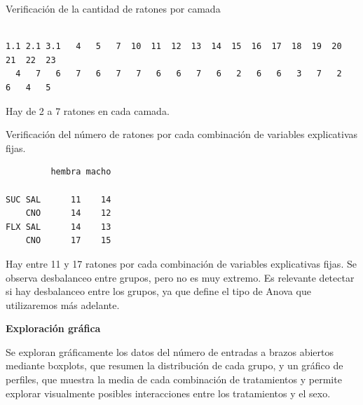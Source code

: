 \documentclass[
  letterpaper,
  DIV=11,
  numbers=noendperiod]{scrartcl}
\newenvironment{Shaded}{\begin{snugshade}}{\end{snugshade}}
\newcommand{\FunctionTok}[1]{\textcolor[rgb]{0.28,0.35,0.67}{#1}}
\newcommand{\NormalTok}[1]{\textcolor[rgb]{0.00,0.23,0.31}{#1}}
\newcommand{\SpecialCharTok}[1]{\textcolor[rgb]{0.37,0.37,0.37}{#1}}
\begin{document}
Verificación de la cantidad de ratones por camada

\begin{Shaded}
\end{Shaded}

\begin{verbatim}

1.1 2.1 3.1   4   5   7  10  11  12  13  14  15  16  17  18  19  20  21  22  23 
  4   7   6   7   6   7   7   6   6   7   6   2   6   6   3   7   2   6   4   5 
\end{verbatim}

Hay de 2 a 7 ratones en cada camada.

Verificación del número de ratones por cada combinación de variables
explicativas fijas.

\begin{Shaded}
\end{Shaded}

\begin{verbatim}
         hembra macho
                     
SUC SAL      11    14
    CNO      14    12
FLX SAL      14    13
    CNO      17    15
\end{verbatim}

Hay entre 11 y 17 ratones por cada combinación de variables explicativas
fijas. Se observa desbalanceo entre grupos, pero no es muy extremo. Es
relevante detectar si hay desbalanceo entre los grupos, ya que define el
tipo de Anova que utilizaremos más adelante.

\textbf{Exploración gráfica}

Se exploran gráficamente los datos del número de entradas a brazos
abiertos mediante boxplots, que resumen la distribución de cada grupo, y
un gráfico de perfiles, que muestra la media de cada combinación de
tratamientos y permite explorar visualmente posibles interacciones entre
los tratamientos y el sexo.
\end{document}
